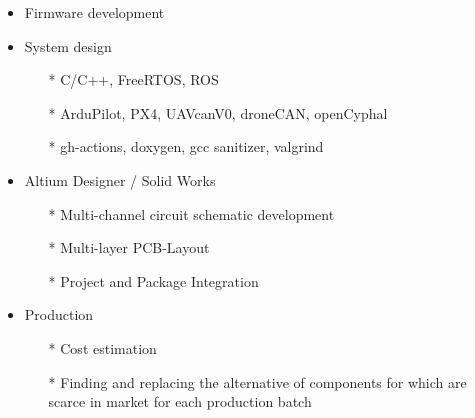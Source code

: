         {
        \begin{itemize}
            \item Firmware development
            \item System design
            \begin{itemize}
                \item[*] C/C++, FreeRTOS, ROS
                \item[*] ArduPilot, PX4, UAVcanV0, droneCAN, openCyphal
                \item[*] gh-actions, doxygen, gcc sanitizer, valgrind
            \end{itemize}
            \item Altium Designer / Solid Works \begin{itemize}
                \item[*] Multi-channel circuit schematic development
                \item[*] Multi-layer PCB-Layout
                \item[*] Project and Package Integration
            \end{itemize}
            \item Production 
            \begin{itemize}
            \item[*] Cost estimation 
            \item[*] Finding and replacing the alternative of components for which are scarce in market for each production batch
            \end{itemize} 
        \end{itemize}
        }

